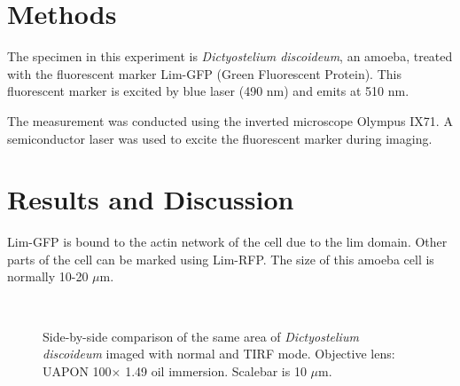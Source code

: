 \section{Methods}

The specimen in this experiment is \textit{Dictyostelium discoideum}, an amoeba, treated with the fluorescent marker Lim-GFP (Green Fluorescent Protein). 
This fluorescent marker is excited by blue laser (490 nm) and emits at 510 nm. 

The measurement was conducted using the inverted microscope Olympus IX71. 
A semiconductor laser was used to excite the fluorescent marker during imaging.
\section{Results and Discussion}
Lim-GFP is bound to the actin network of the cell due to the lim domain. Other parts of the cell can be marked using Lim-RFP.
The size of this amoeba cell is normally 10-20 $\mu$m.

\begin{figure}[h]
\centering
{} \hspace{0.1mm}
 \\
\caption[a: normal, b: opsec.]{Side-by-side comparison of the same area of \textit{Dictyostelium discoideum} imaged with normal and TIRF mode. 
Objective lens: UAPON 100$\times$ 1.49 oil immersion. 
Scalebar is 10 $\mu$m.} 
\label{fig:amoebatirf}
\end{figure}

